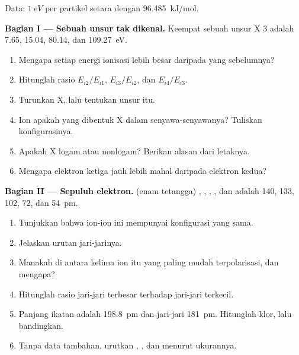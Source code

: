 \begin{problem}
\label{pb:b1:periodicity:1}
Data: $\qty{1}{eV}$ per partikel setara dengan \qty{96.485}{kJ/mol}.

\medskip
\noindent\textbf{Bagian I --- Sebuah unsur tak dikenal.}
Keempat  sebuah unsur X  3 adalah 7.65,
15.04, 80.14, dan \qty{109.27}{eV}.
\begin{enumerate}
  \item Mengapa setiap energi ionisasi lebih besar daripada yang
        sebelumnya?
  \item Hitunglah rasio $E_{i2}/E_{i1}$, $E_{i3}/E_{i2}$, dan
        $E_{i4}/E_{i3}$.
  \item Turunkan  X, lalu tentukan unsur itu.
  \item Ion apakah yang dibentuk X dalam senyawa-senyawanya? Tuliskan
        konfigurasinya.
  \item Apakah X logam atau nonlogam? Berikan alasan dari letaknya.
  \item Mengapa elektron ketiga jauh lebih mahal daripada elektron kedua?
\end{enumerate}

\medskip
\noindent\textbf{Bagian II --- Sepuluh elektron.}
 (enam tetangga) , , ,
, dan  adalah 140, 133, 102, 72, dan
\qty{54}{pm}.
\begin{enumerate}[resume]
  \item Tunjukkan bahwa ion-ion ini mempunyai konfigurasi yang sama.
  \item Jelaskan urutan jari-jarinya.
  \item Manakah di antara kelima ion itu yang paling mudah
        terpolarisasi, dan mengapa?
  \item Hitunglah rasio jari-jari terbesar terhadap jari-jari terkecil.
  \item Panjang ikatan  adalah \qty{198.8}{pm} dan jari-jari
         \qty{181}{pm}. Hitunglah  klor, lalu
        bandingkan.
  \item Tanpa data tambahan, urutkan , , dan 
        menurut ukurannya.
\end{enumerate}


\end{problem}
